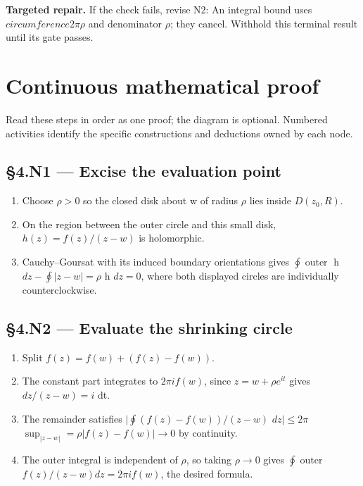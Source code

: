 \documentclass[preprint,12pt,aps,pra,showkeys,amsmath,amssymb,superscriptaddress,floatfix]{revtex4-2}
\theoremstyle{definition}
\theoremstyle{remark}
\newcommand{\field}[2]{\par\smallskip\noindent\textbf{#1.} #2\par}
\begin{document}
\field{Targeted repair}{If the check fails, revise N2: An integral bound uses
\(circumference2\pi \rho\) and denominator \(\rho\); they cancel.
Withhold this terminal result until its gate passes.}

\endgroup\clearpage\section{Continuous mathematical proof}\label{sec:proof}

Read these steps in order as one proof; the diagram is optional.
Numbered activities identify the specific constructions and deductions
owned by each node.

\subsection{§4.N1 --- Excise the evaluation
point}\label{n1-excise-the-evaluation-point}

\begin{enumerate}
\def\labelenumi{\arabic{enumi}.}
\item
  Choose \(\rho >0\) so the closed disk about w of radius \(\rho\) lies
  inside \(D(z_{0},R)\).
\item
  On the region between the outer circle and this small disk,
  \(h(z)=f(z)/(z-w)\) is holomorphic.
\item
  Cauchy--Goursat with its induced boundary orientations gives
  \(\oint \operatorname{outer}\) h \(dz-\oint |z-w|=\rho\) h \(dz=0\),
  where both displayed circles are individually counterclockwise.
\end{enumerate}

\subsection{§4.N2 --- Evaluate the shrinking
circle}\label{n2-evaluate-the-shrinking-circle}

\begin{enumerate}
\def\labelenumi{\arabic{enumi}.}
\item
  Split \(f(z)=f(w)+(f(z)-f(w))\).
\item
  The constant part integrates to \(2\pi if(w)\), since
  \(z=w+\rho e^{it}\) gives \(dz/(z-w)=i\) dt.
\item
  The remainder satisfies \(|\oint (f(z)-f(w))/(z-w)\) \(dz|\le 2\pi\)
  \(\operatorname{sup} _|z-w|=\rho |f(z)-f(w)|\to 0\) by continuity.
\item
  The outer integral is independent of \(\rho\), so taking
  \(\rho \to 0\) gives \(\oint \operatorname{outer}\)
  \(f(z)/(z-w)dz=2\pi if(w)\), the desired formula.
\end{enumerate}
\end{document}
